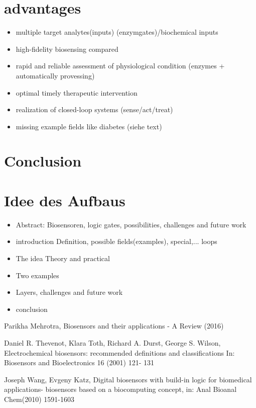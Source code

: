\documentclass[runningheads]{llncs}
\begin{document}
\section{advantages}

	\begin{itemize}	
		\item multiple target analytes(inputs) (enzymgates)/biochemical inputs 
		\item high-fidelity biosensing compared 
		\item rapid and reliable assessment of physiological condition (enzymes + automatically provessing)
		\item optimal timely therapeutic intervention
		\item realization of closed-loop systems (sense/act/treat)
		\item missing example fields like diabetes (siehe text)	
	\end{itemize}




\section{Conclusion} 




\section{Idee des Aufbaus}
\begin{itemize}
	\item Abstract:
	Biosensoren, logic gates, possibilities, challenges and future work
	\item introduction
	Definition, possible fields(examples), special,... loops
	\item The idea 
	Theory and practical
	\item Two examples 
	\item Layers, challenges and future work
	\item conclusion
\end{itemize}


\begin{thebibliography}{8}
	Parikha Mehrotra, Biosensors and their applications - A Review (2016)
	
	Daniel R. Thevenot, Klara Toth, Richard A. Durst, George S. Wilson, Electrochemical biosensors: recommended definitions and classifications In: Biosensors and Bioelectronics 16 (2001) 121- 131
	
	Joseph Wang, Evgeny Katz, Digital biosensors with build-in logic for biomedical applications- biosensors based on a biocomputing concept, in: Anal Bioanal Chem(2010) 1591-1603
	
\end{thebibliography}
\end{document}
